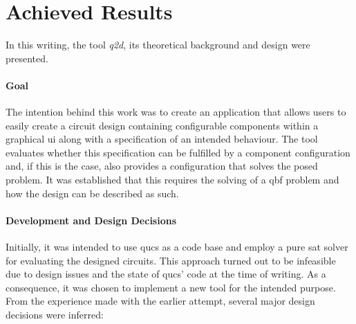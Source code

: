 \section{Achieved Results}

	In this writing, the tool \emph{q2d}, its theoretical background and design were presented.
	
	\paragraph{Goal}
	The intention behind this work was to create an application that allows users to easily create a circuit design containing configurable components within a graphical \gls{ui} along with a specification of an intended behaviour.
	The tool evaluates whether this specification can be fulfilled by a component configuration and, if this is the case, also provides a configuration that solves the posed problem.
	It was established that this requires the solving of a \gls{qbf} problem and how the design can be described as such.
	
	\paragraph{Development and Design Decisions}
	Initially, it was intended to use \gls{qucs} as a code base and employ a pure \gls{sat} solver for evaluating the designed circuits.
	This approach turned out to be infeasible due to design issues and the state of \gls{qucs}' code at the time of writing.
	As a consequence, it was chosen to implement a new tool for the intended purpose.
	 From the experience made with the earlier attempt, several major design decisions were inferred:
	 
